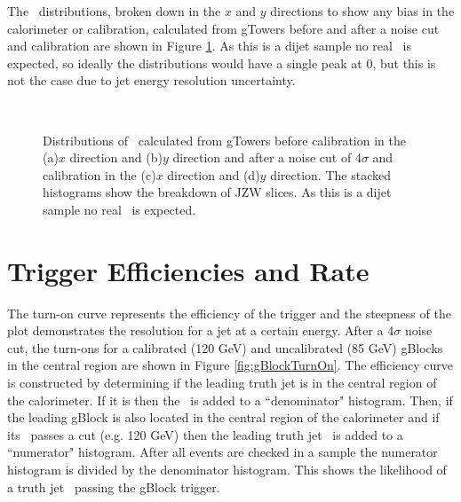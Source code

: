 The \met\ distributions, broken down in the $x$ and $y$ directions to show any bias in the calorimeter or calibration, calculated from gTowers before and after a noise cut and calibration are shown in Figure \ref{fig:gTowerMet}.  As this is a dijet sample no real \met\ is expected, so ideally the distributions would have a single peak at 0, but this is not the case due to jet energy resolution uncertainty. \\ %

\begin{figure}[t]
  \begin{center}
     \\
    \caption[Distributions of gTower \met\ .]{Distributions of \met\ calculated from gTowers before calibration in the (a)$x$ direction and (b)$y$ direction and after a noise cut of 4$\sigma$ and calibration in the (c)$x$ direction and (d)$y$ direction. The stacked histograms show the breakdown of JZW slices. As this is a dijet sample no real \met\ is expected.}
    \label{fig:gTowerMet}
  \end{center}
\end{figure}

\section{Trigger Efficiencies and Rate}

The turn-on curve represents the efficiency of the trigger and the steepness of the plot demonstrates the resolution for a jet at a certain energy.  After a 4$\sigma$ noise cut, the turn-ons for a calibrated (120 GeV) and uncalibrated (85 GeV) gBlocks in the central region  are shown in Figure \ref{fig:gBlockTurnOn}.  The efficiency curve is constructed by determining if the leading truth jet is in the central region of the calorimeter.  If it is then the \pt\ is added to a ``denominator" histogram.  Then, if the leading gBlock is also located in the central region of the calorimeter and if its \pt\ passes a cut (e.g. 120 GeV) then the leading truth jet \pt\ is added to a ``numerator" histogram.  After all events are checked in a sample the numerator histogram is divided by the denominator histogram.  This shows the likelihood of a truth jet \pt\ passing the gBlock trigger.  \\

